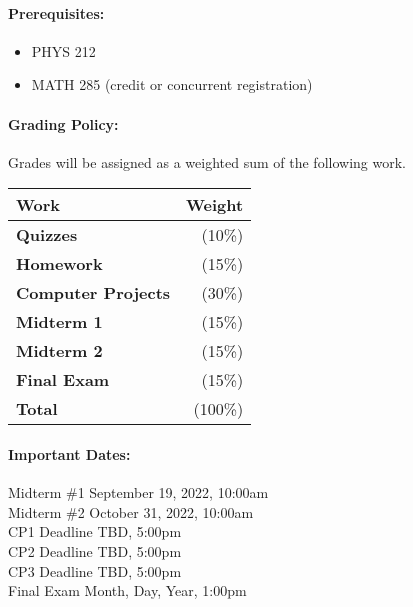 \documentclass[11pt, a4paper]{article}
\begin{document}
\paragraph{Prerequisites:}
\begin{itemize}
\item PHYS 212
\item MATH 285 (credit or concurrent registration)
\end{itemize}

\paragraph{Grading Policy:} Grades will be assigned as a weighted sum of the following work.

\begin{table}[h]
\begin{tabularx}{\textwidth}{Xr}
\textbf{Work} & \textbf{Weight}\\
\hline
\textbf{Quizzes} & (10\%) \\
\textbf{Homework} & (15\%) \\
\textbf{Computer Projects} & (30\%) \\
\textbf{Midterm 1} & (15\%) \\
\textbf{Midterm 2} & (15\%) \\
\textbf{Final Exam} & (15\%) \\
\hline
\textbf{Total} & (100\%) \\
\end{tabularx}
\end{table}

\paragraph{Important Dates:}
\begin{center} \begin{minipage}{3.8in}
\begin{flushleft}
Midterm \#1       \dotfill September 19, 2022, 10:00am  \\
Midterm \#2       \dotfill October 31, 2022, 10:00am  \\
CP1 Deadline      \dotfill TBD, 5:00pm  \\
CP2 Deadline      \dotfill TBD, 5:00pm  \\
CP3 Deadline      \dotfill TBD, 5:00pm  \\
Final Exam        \dotfill Month, Day, Year, 1:00pm  \\
\end{flushleft}
\end{minipage}
\end{center}
\end{document}
